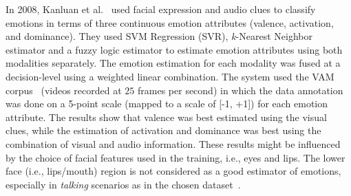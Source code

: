 \documentclass[10pt,journal,cspaper,compsoc]{IEEEtran}
\begin{document}

In 2008, Kanluan et al.~\cite{kanluan2008audio} used facial expression and audio clues to classify emotions in terms of three continuous emotion attributes (valence, activation, and dominance). They used SVM Regression (SVR), \textit{k}-Nearest Neighbor estimator and a fuzzy logic estimator to estimate emotion attributes using both modalities separately. The emotion estimation for each modality was fused at a decision-level using a weighted linear combination. The system used the VAM corpus~\cite{grimm2008vera} (videos recorded at $25$ frames per second) in which the data annotation was done on a 5-point scale (mapped to a scale of [-1, +1]) for each emotion attribute. The results show that valence was best estimated using the visual clues, while the estimation of activation and dominance was best using the combination of visual and audio information. These results might be influenced by the choice of facial features used in the training, i.e., eyes and lips. The lower face (i.e., lips/mouth) region is not considered as a good estimator of emotions, especially in \textit{talking} scenarios as in the chosen dataset~\cite{costantini2005recognising}.
\end{document}

